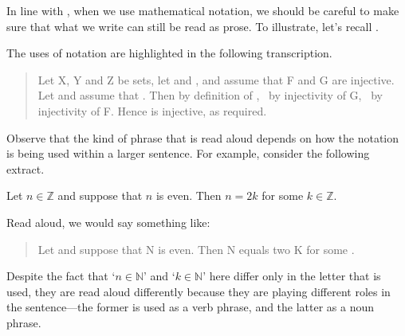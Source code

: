 In line with , when we use mathematical notation, we should be careful to make sure that what we write can still be read as prose. To illustrate, let's recall .

\rxtrInjectiveWithProse*

The uses of notation are highlighted in the following transcription.

\begin{quote}
Let X, Y and Z be sets, let  and  , and assume that F and G are injective. Let   and assume that . Then   by definition of ,  \,  by injectivity of G,  \,  by injectivity of F. Hence  is injective, as required.
\end{quote}

Observe that the kind of phrase that is read aloud depends on how the notation is being used within a larger sentence. For example, consider the following extract.

\begin{extract}
Let $n \in \mathbb{Z}$ and suppose that $n$ is even. Then $n=2k$ for some $k \in \mathbb{Z}$.
\end{extract}

Read aloud, we would say something like:
\begin{quote}
Let  and suppose that N is even. Then N equals two K for some .
\end{quote}
Despite the fact that `$n \in \mathbb{N}$' and `$k \in \mathbb{N}$' here differ only in the letter that is used, they are read aloud differently because they are playing different roles in the sentence---the former is used as a verb phrase, and the latter as a noun phrase.

